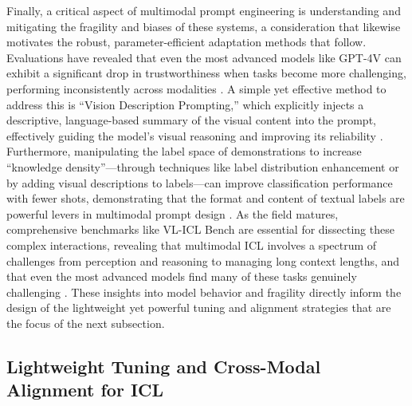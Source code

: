 \documentclass[11pt]{article}
\begin{document}
Finally, a critical aspect of multimodal prompt engineering is understanding and mitigating the fragility and biases of these systems, a consideration that likewise motivates the robust, parameter-efficient adaptation methods that follow. Evaluations have revealed that even the most advanced models like GPT-4V can exhibit a significant drop in trustworthiness when tasks become more challenging, performing inconsistently across modalities \cite{ref244}. A simple yet effective method to address this is ``Vision Description Prompting,'' which explicitly injects a descriptive, language-based summary of the visual content into the prompt, effectively guiding the model's visual reasoning and improving its reliability \cite{ref244}. Furthermore, manipulating the label space of demonstrations to increase ``knowledge density''---through techniques like label distribution enhancement or by adding visual descriptions to labels---can improve classification performance with fewer shots, demonstrating that the format and content of textual labels are powerful levers in multimodal prompt design \cite{ref245}. As the field matures, comprehensive benchmarks like VL-ICL Bench are essential for dissecting these complex interactions, revealing that multimodal ICL involves a spectrum of challenges from perception and reasoning to managing long context lengths, and that even the most advanced models find many of these tasks genuinely challenging \cite{ref13}. These insights into model behavior and fragility directly inform the design of the lightweight yet powerful tuning and alignment strategies that are the focus of the next subsection.

\subsection{Lightweight Tuning and Cross-Modal Alignment for ICL}
\end{document}
